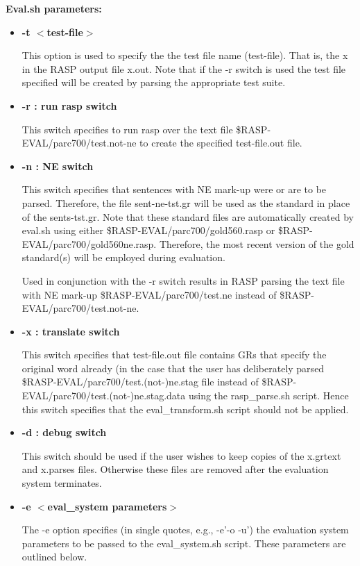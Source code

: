 \documentclass[10pt]{article}
\begin{document}
{\bf Eval.sh parameters:}
\begin{itemize}
\item {\bf -t $<$test-file$>$}

This option is used to specify the the test file name (test-file). 
That is, the x in the RASP output file x.out. 
Note that if the -r switch is used the test file 
specified will be created by parsing the appropriate test suite.

\item {\bf -r : run rasp switch}

This switch specifies to run rasp over the text file
\$RASP-EVAL/parc700/test.not-ne 
to create the specified test-file.out file.

\item {\bf -n : NE switch}

This switch specifies that sentences with NE mark-up 
were or are to be parsed.
Therefore, the file sent-ne-tst.gr will
be used as the standard in place of the sents-tst.gr.
Note that these standard files are automatically created
by eval.sh using either \$RASP-EVAL/parc700/gold560.rasp or
\$RASP-EVAL/parc700/gold560ne.rasp. Therefore,
the most recent version of the gold standard(s) will
be employed during evaluation.

Used in conjunction with the -r switch results
in RASP parsing the text file with NE mark-up
\$RASP-EVAL/parc700/test.ne instead of 
\$RASP-EVAL/parc700/test.not-ne.

\item {\bf -x : translate switch}

This switch specifies that test-file.out file
contains GRs that specify the original word already
(in the case that the user has deliberately parsed
\$RASP-EVAL/parc700/test.(not-)ne.stag file instead
of \$RASP-EVAL/parc700/test.(not-)ne.stag.data 
using the rasp\_parse.sh script. Hence this switch
specifies that the eval\_transform.sh script should
not be applied.

\item {\bf -d : debug switch}

This switch should be used if the user wishes to keep copies
of the x.grtext and x.parses files. Otherwise these files
are removed after the evaluation system terminates.

\item {\bf -e $<$eval\_system parameters$>$}

The -e option specifies (in single quotes, e.g., -e'-o -u') 
the evaluation system parameters to be passed 
to the eval\_system.sh script. These parameters are outlined below.

\end{itemize}
\end{document}

